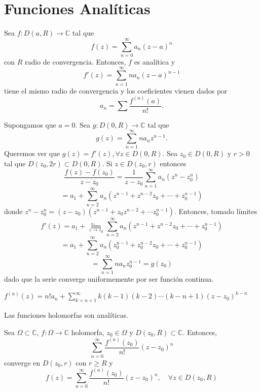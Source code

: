 \section{Funciones Analíticas}

\begin{theo}
  Sea $f : D(a, R) \to \mathbb{C}$ tal que
  \[
    f(z) = \sum_{n = 0}^{\infty} a_{n} (z - a)^{n}
  \]
  con $R$ radio de convergencia. Entonces, $f$ es analítica y
  \[ 
    f'(z) = \sum_{n = 1}^{\infty} n a_{n} (z - a)^{n - 1} 
  \] 
  tiene el mismo radio de convergencia y los coeficientes vienen dados por
  \[
    a_{n} = \sum \frac{f^{(n)}(a)}{n!}.
  \]
\end{theo}

\begin{dem}
  Supongamos que $a=0$. Sea $g : D(0, R) \to \mathbb{C}$ tal que
  \[ 
    g(z) = \sum_{n = 1}^{\infty} n a_{n} z^{n -1} .
  \] 
  Queremos ver que $g(z) = f'(z), \forall z \in D(0, R)$. Sea $z_{0} \in D(0, R)$ y $r>0$ tal que $D(z_{0}, 2r) \subset D(0, R)$. Si $z \in D(z_{0},r)$ entonces
  \[ 
    \frac{f(z) - f(z_{0})}{z - z_{0}} = \frac{1}{ z - z_{0}} \sum_{n = 1}^{\infty} a_{n} (z^{n} - z_{0}^{n}) 
  \] 
  \[ 
    = a_{1} + \sum_{n = 2}^{\infty} a_{n}(z^{n-1} + z^{n-2} z_{0} + \cdots + z_{0}^{n-1})
  \] 
  donde $z^{n} - z_{0}^{n} = (z - z_{0})(z^{n-1} + z_{0} z^{n-2} + \cdots z_{0}^{n-1})$. Entonces, tomado límites
  \[ 
    f'(z) = a_{1} + \lim_{z \to z_{0}} \sum_{n = 2}^{\infty} a_{n}(z^{n-1} + z^{n-2} z_{0} + \cdots + z_{0}^{n-1})
  \] 
  \[ 
    =  a_{1} + \sum_{n = 2}^{\infty} a_{n}(z_{0}^{n-1} + z_{0}^{n-2} z_{0} + \cdots + z_{0}^{n-1})
  \] 
  \[ 
    = \sum_{n = 1}^{\infty} n a_{n} z_{0}^{n -1} = g(z_{0}) 
  \] 
  dado que la serie converge uniformemente por ser función continua.
\end{dem}

\begin{obs}
  $f^{(n)}(z) = n! a_{n} + \sum_{k = n+1}^{\infty} k(k-1)(k-2) \cdots (k-n +1)(z - z_{0})^{k-n}$
\end{obs}

\begin{obs}
  Las funciones holomorfas son analíticas.
\end{obs}

\begin{theo}
  Sea $\Omega \subset \mathbb{C}$, $f : \Omega \to \mathbb{C}$ holomorfa, $z_{0} \in \Omega$ y $D(z_{0}, R) \subset \mathbb{C}$. Entonces, 
  \[ 
    \sum_{n = 0}^{\infty} \frac{f^{(n)}(z_{0})}{n!}(z - z_{0})^{n}
  \] 
  converge en $D(z_{0}, r)$ con $r \geq R$ y
  \[ 
    f(z) = \sum_{n = 0}^{\infty} \frac{f^{(n)}(z_{0})}{n!}(z - z_{0})^{n}, \quad \forall z \in D(z_{0}, R) 
  \] 
\end{theo}

